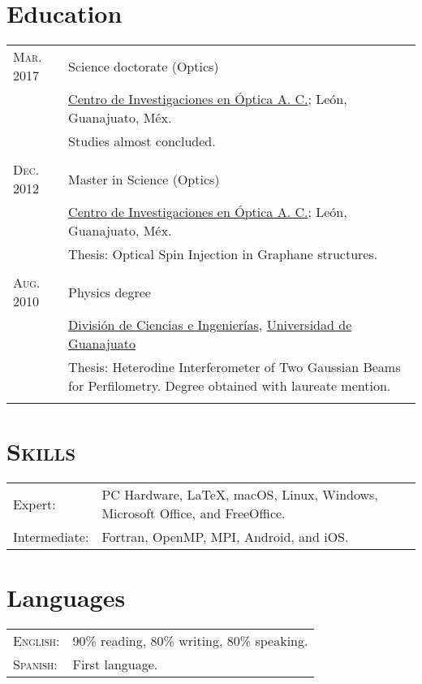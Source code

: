 \documentclass[letterpaper,10pt]{article}
\begin{document}
\section{Education}
\begin{tabular}{R{4cm}|p{11cm}}
\textsc{Mar. 2017 } &   Science doctorate (Optics) \\
                        &   \href{http://www.cio.mx/}{Centro de Investigaciones en \'Optica A. C.}; Le\'on, Guanajuato, M\'ex.\\
                        &   Studies almost concluded.\\
                     \\

\textsc{Dec. 2012 } &   Master in Science (Optics) \\
                        &   \href{http://www.cio.mx/}{Centro de Investigaciones en \'Optica A. C.}; Le\'on, Guanajuato, M\'ex.\\
                        &   Thesis: Optical Spin Injection in Graphane structures.\\
                     \\

\textsc{Aug. 2010 } &   Physics degree \\
                        &   \href{https://fisica.ugto.mx}{Divisi\'on de Ciencias e Ingenier\'ias}, \href{http://www.ugto.mx}{Universidad de Guanajuato}\\
                        &   Thesis: Heterodine Interferometer of Two Gaussian Beams for Perfilometry. Degree obtained with laureate mention.\\
                     \\
\end{tabular}

\section{\textsc{Skills}}
    \begin{tabular}{R{4cm} p{10cm}}
        Expert:    &   PC Hardware, \LaTeX, macOS, Linux, Windows, Microsoft Office, and FreeOffice.\\ 
        Intermediate: &   Fortran, OpenMP, MPI, Android, and iOS.\\
    \end{tabular}

\section{Languages}
    \begin{tabular}{R{4cm}l}
        \textsc{English}:  &   90\% reading, 80\% writing, 80\% speaking. \\
        \textsc{Spanish}: &   First language. \\
    \end{tabular}
\end{document}
